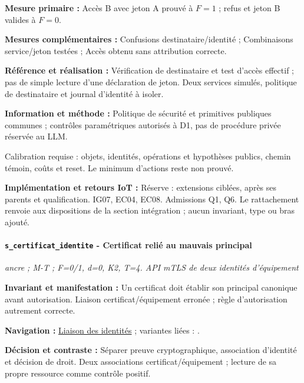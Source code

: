 \documentclass[11pt,a4paper]{article}
\newcommand{\code}[1]{{\small\ttfamily\path{#1}}}
\newcommand{\scenariolink}[1]{\hyperref[scenario:#1]{\code{#1}}}
\newcommand{\comparisonlink}[2]{\hyperlink{comparison:#1}{#2}}
\begin{document}
\textbf{Mesure primaire :} Accès B avec jeton A prouvé à $F=1$ ; refus et jeton B valides à $F=0$.

\textbf{Mesures complémentaires :} Confusions destinataire/identité ; Combinaisons service/jeton testées ; Accès obtenu sans attribution correcte.

\textbf{Référence et réalisation :} Vérification de destinataire et test d’accès effectif ; pas de simple lecture d’une déclaration de jeton. Deux services simulés, politique de destinataire et journal d’identité à isoler.

\textbf{Information et méthode :} Politique de sécurité et primitives publiques communes ; contrôles paramétriques autorisés à D1, pas de procédure privée réservée au LLM.

Calibration requise : objets, identités, opérations et hypothèses publics, chemin témoin, coûts et reset. Le minimum d’actions reste non prouvé.

\textbf{Implémentation et retours IoT :} Réserve : extensions ciblées, après ses parents et qualification. IG07, EC04, EC08. Admissions Q1, Q6. Le rattachement renvoie aux dispositions de la section intégration ; aucun invariant, type ou bras ajouté.

\par\noindent\begin{minipage}{\linewidth}\setlength{\parskip}{5pt}\paragraph{\texttt{s\_certificat\_identite} - Certificat relié au mauvais principal}\label{scenario:s_certificat_identite}
\textit{ancre ; M-T ; F=0/1, d=0, K2, T=4. API mTLS de deux identités d’équipement}

\textbf{Invariant et manifestation :} Un certificat doit établir son principal canonique avant autorisation. Liaison certificat/équipement erronée ; règle d’autorisation autrement correcte.\par\end{minipage}\par


\textbf{Navigation :} \comparisonlink{E19}{Liaison des identités} ; variantes liées : \scenariolink{s_passerelle_identite}.

\textbf{Décision et contraste :} Séparer preuve cryptographique, association d’identité et décision de droit. Deux associations certificat/équipement ; lecture de sa propre ressource comme contrôle positif.
\end{document}
